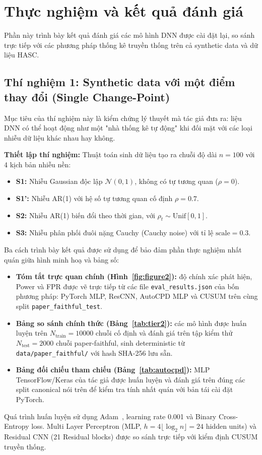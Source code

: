 \section{Thực nghiệm và kết quả đánh giá}

Phần này trình bày kết quả đánh giá các mô hình DNN được cài đặt lại, so sánh trực tiếp với các phương pháp thống kê 
truyền thống trên cả synthetic data và dữ liệu HASC.

\subsection{Thí nghiệm 1: Synthetic data với một điểm thay đổi (Single Change-Point)}

Mục tiêu của thí nghiệm này là kiểm chứng lý thuyết mà tác giả đưa ra: 
liệu DNN có thể hoạt động như một "nhà thống kê tự động" khi đối mặt với các loại nhiễu dữ liệu khác nhau hay không. 

\textbf{Thiết lập thí nghiệm:} Thuật toán sinh dữ liệu tạo ra chuỗi độ dài $n=100$ với 4 kịch bản nhiễu nền:
\begin{itemize}
    \item \textbf{S1:} Nhiễu Gaussian độc lập $\mathcal{N}(0,1)$, không có tự tương quan ($\rho = 0$).
    \item \textbf{S1':} Nhiễu AR(1) với hệ số tự tương quan cố định $\rho = 0.7$.
    \item \textbf{S2:} Nhiễu AR(1) biến đổi theo thời gian, với $\rho_t \sim \text{Unif}[0, 1]$.
    \item \textbf{S3:} Nhiễu phân phối đuôi nặng Cauchy (Cauchy noise) với tỉ lệ $\text{scale} = 0.3$.
\end{itemize}
Ba cách trình bày kết quả được sử dụng để bảo đảm phần thực nghiệm nhất quán giữa hình minh hoạ và bảng số:
\begin{itemize}
    \item \textbf{Tóm tắt trực quan chính (Hình~\ref{fig:figure2}):} độ chính xác phát hiện, Power và FPR
    được vẽ trực tiếp từ các file \texttt{eval\_results.json} của bốn phương pháp:
    PyTorch MLP, ResCNN, AutoCPD MLP và CUSUM trên cùng split \texttt{paper\_faithful\_test}.
    \item \textbf{Bảng so sánh chính thức (Bảng~\ref{tab:tier2}):} các mô hình được huấn luyện 
    trên $N_{\text{train}} = 10000$ chuỗi cố định và đánh giá trên tập kiểm thử $N_{\text{test}} = 2000$ 
    chuỗi paper-faithful, sinh deterministic từ \texttt{data/paper\_faithful/} với hash SHA-256 lưu sẵn.
    \item \textbf{Bảng đối chiếu tham chiếu (Bảng~\ref{tab:autocpd}):} MLP TensorFlow/Keras của tác giả
    được huấn luyện và đánh giá trên đúng các split canonical nói trên để kiểm tra tính nhất quán với bản tái cài đặt PyTorch.
\end{itemize}
Quá trình huấn luyện sử dụng Adam~\cite{kingma2015adam}, learning rate 0.001 và Binary Cross-Entropy loss. 
Multi Layer Perceptron (MLP, $h = 4\lfloor\log_2 n\rfloor = 24$ hidden units) và Residual CNN (21 Residual blocks) được so sánh trực tiếp 
với kiểm định CUSUM truyền thống.

